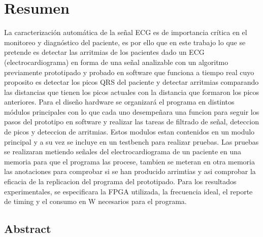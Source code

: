 \chapter{Resumen}

	La caracterización automática de la señal ECG es de importancia crítica 
	en el monitoreo y diagnóstico del paciente, es por ello que en este trabajo 
	lo que se pretende es detectar las arritmias de los pacientes dado un ECG 
	(electrocardiograma) en forma de una señal analizable con un algoritmo previamente prototipado y probado en software 
    que funciona a tiempo real cuyo proposito es detectar los picos QRS del paciente y detectar arritmias comparando 
    las distancias que tienen los picos actuales con la distancia que formaron los picos anteriores. Para el diseño 
    hardware se organizará el programa en distintos módulos principales con lo que cada uno desempeñara una funcion para 
    seguir los pasos del prototipo en software y realizar las tareas de filtrado de señal, deteccion de picos y deteccion de arritmias.
    Estos modulos estan contenidos en un modulo principal y a su vez se incluye en un testbench para realizar pruebas. Las pruebas se 
    realizaran metiendo señales del electrocardiograma de un paciente en una memoria para que el programa las procese, tambien se meteran 
    en otra memoria las anotaciones para comprobar si se han producido arrimtias y asi comprobar la eficacia de la replicacion del programa
    del prototipado. Para los resultados experimentales, se especificara la FPGA utilizada, la frecuencia ideal, el reporte de timing y el 
    consumo en W necesarios para el programa. 

\section{Abstract}

